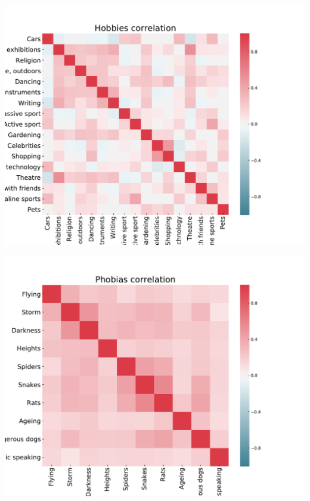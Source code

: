 \documentclass[russian, 10pt]{beamer}
\begin{document}
\begin{frame}

\centering
\includegraphics[scale=0.45]{images/5.pdf}

\end{frame}

\begin{frame}

\centering
\includegraphics[scale=0.45]{images/6.pdf}

\end{frame}
\end{document}
